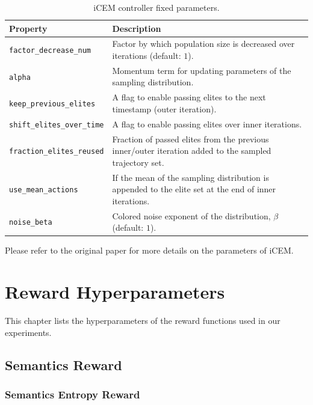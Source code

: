 \begin{table}[H]
    \centering
    \begin{tabularx}{\textwidth}{C{4.7cm} L}
        \hline
        Property & Description\\
        \hline
        \texttt{factor\_decrease\_num} & Factor by which population size is decreased over iterations (default: \(1\)).\\
        \texttt{alpha} & Momentum term for updating parameters of the sampling distribution.\\
        \texttt{keep\_previous\_elites} & A flag to enable passing elites to the next timestamp (outer iteration).\\
        \texttt{shift\_elites\_over\_time} & A flag to enable passing elites over inner iterations.\\
        \texttt{fraction\_elites\_reused} & Fraction of passed elites from the previous inner/outer iteration added to the sampled trajectory set.\\
        \texttt{use\_mean\_actions} & If the mean of the sampling distribution is appended to the elite set at the end of inner iterations.\\
        \texttt{noise\_beta} & Colored noise exponent of the distribution, \(\beta\) (default: \(1\)).\\
        \hline
    \end{tabularx}
    \caption{iCEM controller fixed parameters.}
    \label{tab:icem-params-fixed}
\end{table}


Please refer to the original paper for more details on the parameters of iCEM.


\chapter{Reward Hyperparameters}
\label{sec:reward-details}

This chapter lists the hyperparameters of the reward functions used in our experiments.

\section{Semantics Reward}
\label{sec:semantics-reward-details}

\subsection{Semantics Entropy Reward}
\label{sec:semantics-entropy-reward-details}

